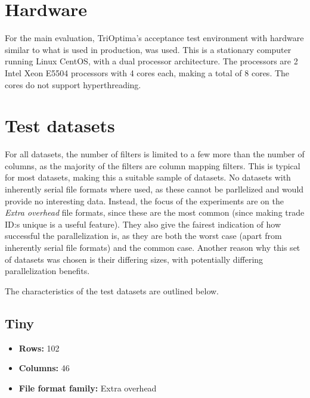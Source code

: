 \section{Hardware}
For the main evaluation, TriOptima’s acceptance test environment with hardware similar to what is used in production, was used. This is a stationary computer running Linux CentOS,
with a dual processor architecture. The processors are 2 Intel Xeon E5504 processors with 4 cores each, making a total of 8 cores. The cores do not support hyperthreading.

\section{Test datasets}
For all datasets, the number of filters is limited to a few more than the number of columns, as the majority of the filters are column mapping filters.
This is typical for most datasets, making this a suitable sample of datasets. No datasets with inherently serial file formats where used, as these cannot be
parllelized and would provide no interesting data. Instead, the focus of the experiments are on the \textit{Extra overhead} file formats, since these are the
most common (since making trade ID:s unique is a useful feature). They also give the fairest indication of how successful the parallelization is, as they are
both the worst case (apart from inherently serial file formats) and the common case. Another reason why this set of datasets was chosen is their differing sizes,
with potentially differing parallelization benefits.

The characteristics of the test datasets are outlined below.

\subsection{Tiny}
\begin{itemize}
  \item \textbf{Rows:} 102
  \item \textbf{Columns:} 46
  \item \textbf{File format family:} Extra overhead
\end{itemize}

